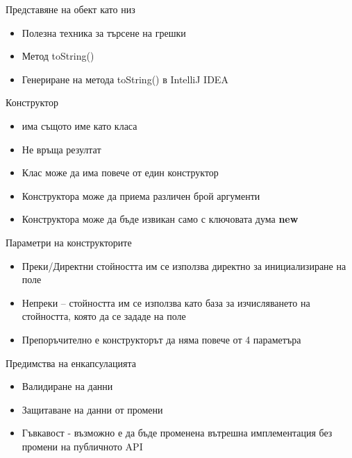 \documentclass{beamer}
\begin{document}
\begin{frame}{Представяне на обект като низ}
  \transdissolve
  \begin{itemize}
  \item Полезна техника за търсене на грешки
  \item Метод toString()
  \item Генериране на метода toString() в IntelliJ IDEA
  \end{itemize}
\end{frame}

\begin{frame}{Конструктор}
  \transdissolve
  \begin{itemize}
  \item има същото име като класа
  \item Не връща резултат
  \item  Клас може да има повече от един
    конструктор
  \item  Конструктора може да приема различен
    брой аргументи
  \item  Конструктора може да бъде извикан
    само с ключовата дума \textbf{new}
  \end{itemize}
\end{frame}

\begin{frame}{Параметри на конструкторите}
  \transdissolve
  \begin{itemize}
  \item Преки/Директни 
    стойността им се
    използва директно за инициализиране
    на поле
  \item Непреки – 
    стойността им се
    използва като база за изчисляването на
    стойността, която да се зададе на поле
    \item Препоръчително е конструкторът да няма повече от 4 параметъра
  \end{itemize}
\end{frame}

\begin{frame}{Предимства на енкапсулацията}
  \transdissolve
  \begin{itemize}
  \item   Валидиране на данни
  \item  Защитаване на данни от промени
  \item  Гъвкавост -  възможно е да бъде
    променена вътрешна имплементация
    без промени на публичното API

  \end{itemize}
\end{frame}
\end{document}
